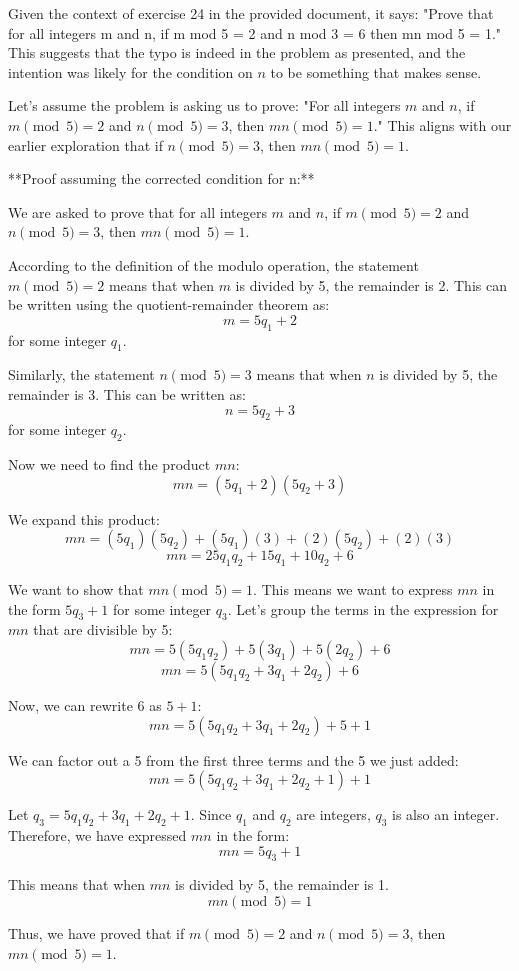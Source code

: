 \documentclass{article}
\begin{document}
Given the context of exercise 24 in the provided document, it says: "Prove that for all integers m and n, if m mod 5 = 2 and n mod 3 = 6 then mn mod 5 = 1." This suggests that the typo is indeed in the problem as presented, and the intention was likely for the condition on $n$ to be something that makes sense.

Let's assume the problem is asking us to prove: "For all integers $m$ and $n$, if $m \pmod 5 = 2$ and $n \pmod 5 = 3$, then $mn \pmod 5 = 1$." This aligns with our earlier exploration that if $n \pmod 5 = 3$, then $mn \pmod 5 = 1$.

**Proof assuming the corrected condition for n:**

We are asked to prove that for all integers $m$ and $n$, if $m \pmod 5 = 2$ and $n \pmod 5 = 3$, then $mn \pmod 5 = 1$.

According to the definition of the modulo operation, the statement $m \pmod 5 = 2$ means that when $m$ is divided by 5, the remainder is 2. This can be written using the quotient-remainder theorem as:
$$ m = 5q_1 + 2 $$
for some integer $q_1$.

Similarly, the statement $n \pmod 5 = 3$ means that when $n$ is divided by 5, the remainder is 3. This can be written as:
$$ n = 5q_2 + 3 $$
for some integer $q_2$.

Now we need to find the product $mn$:
$$ mn = (5q_1 + 2)(5q_2 + 3) $$

We expand this product:
$$ mn = (5q_1)(5q_2) + (5q_1)(3) + (2)(5q_2) + (2)(3) $$
$$ mn = 25q_1q_2 + 15q_1 + 10q_2 + 6 $$

We want to show that $mn \pmod 5 = 1$. This means we want to express $mn$ in the form $5q_3 + 1$ for some integer $q_3$. Let's group the terms in the expression for $mn$ that are divisible by 5:
$$ mn = 5(5q_1q_2) + 5(3q_1) + 5(2q_2) + 6 $$
$$ mn = 5(5q_1q_2 + 3q_1 + 2q_2) + 6 $$

Now, we can rewrite 6 as $5 + 1$:
$$ mn = 5(5q_1q_2 + 3q_1 + 2q_2) + 5 + 1 $$

We can factor out a 5 from the first three terms and the 5 we just added:
$$ mn = 5(5q_1q_2 + 3q_1 + 2q_2 + 1) + 1 $$

Let $q_3 = 5q_1q_2 + 3q_1 + 2q_2 + 1$. Since $q_1$ and $q_2$ are integers, $q_3$ is also an integer.
Therefore, we have expressed $mn$ in the form:
$$ mn = 5q_3 + 1 $$

This means that when $mn$ is divided by 5, the remainder is 1.
$$ mn \pmod 5 = 1 $$

Thus, we have proved that if $m \pmod 5 = 2$ and $n \pmod 5 = 3$, then $mn \pmod 5 = 1$.
\end{document}
